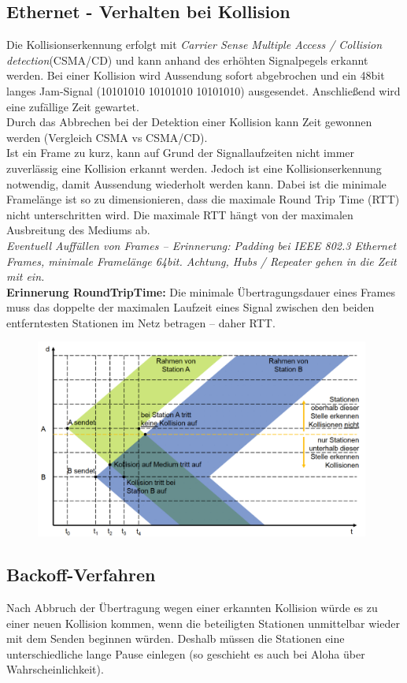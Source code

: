 \documentclass{article} %
\begin{document}
\subsection{Ethernet - Verhalten bei Kollision}	
Die Kollisionserkennung erfolgt mit \textit{Carrier Sense Multiple Access / Collision detection}(CSMA/CD) und kann anhand des erhöhten Signalpegels erkannt werden. Bei einer Kollision wird Aussendung sofort abgebrochen und ein 48bit langes Jam-Signal (10101010 10101010 10101010) ausgesendet. Anschließend wird eine zufällige Zeit gewartet.\\
Durch das Abbrechen bei der Detektion einer Kollision kann Zeit gewonnen werden (Vergleich CSMA vs CSMA/CD).\\
Ist ein Frame zu kurz, kann auf Grund der Signallaufzeiten nicht immer zuverlässig eine Kollision erkannt werden. Jedoch ist eine Kollisionserkennung  notwendig, damit Aussendung wiederholt werden kann. Dabei ist die minimale Framelänge ist so zu dimensionieren, dass die maximale Round Trip Time (RTT) nicht unterschritten wird. Die maximale RTT hängt von der maximalen Ausbreitung des Mediums ab. \\
\textit{Eventuell Auffüllen von Frames – Erinnerung: Padding bei IEEE 802.3 Ethernet Frames, minimale Framelänge 64bit. Achtung, Hubs / Repeater gehen in die Zeit mit ein.}\\
\textbf{Erinnerung RoundTripTime:} Die minimale Übertragungsdauer eines Frames muss das doppelte der maximalen Laufzeit eines Signal zwischen den beiden entferntesten Stationen im Netz betragen – daher RTT. 
	
	\begin{figure}[ht]
	\centering
	\includegraphics[width=11cm]{img/ethernetKollision.png}
	\end{figure}	
	
\subsection{Backoff-Verfahren}	
Nach Abbruch der Übertragung wegen einer erkannten Kollision würde es zu einer neuen Kollision kommen, wenn die beteiligten Stationen unmittelbar wieder mit dem Senden beginnen würden. Deshalb müssen die Stationen eine unterschiedliche lange Pause einlegen (so geschieht es auch bei Aloha über Wahrscheinlichkeit). 	\\
\end{document}
